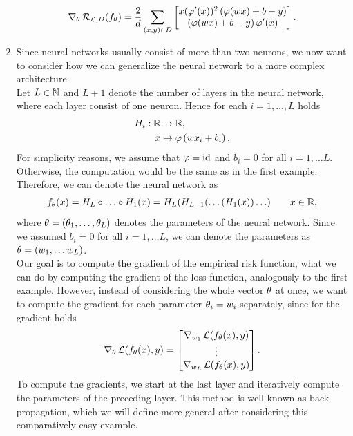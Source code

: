 \begin{example}
\begin{enumerate}
\begin{align*}
\nabla_{\theta} \operatorname{\mathcal{R}}_{\operatorname{\mathcal{L}}, D} (f_{\theta}) = \frac{2}{d} \sum_{(x,y)\in D} \left[ \begin{matrix}
x(\operatorname{\varphi}^{\prime}(x))^2\left(\operatorname{\varphi}(wx) + b - y \right)\\
\left(\operatorname{\varphi}(wx) + b - y \right) \operatorname{\varphi}^{\prime}(x)
\end{matrix}
\right].
\end{align*}
\item Since neural networks usually consist of more than two neurons, we now want to consider how we can generalize the neural network to a more complex architecture.\\
Let $L\in\operatorname{\mathbb{N}}$ and $L+1$ denote the number of layers in the neural network, where each layer consist of one neuron. Hence for each $i=1,\ldots, L$ holds
\begin{align*}
H_i: \operatorname{\mathbb{R}} &\to \operatorname{\mathbb{R}},\\
x &\mapsto \operatorname{\varphi}\left(wx_i + b_i\right).
\end{align*}
For simplicity reasons, we assume that $\operatorname{\varphi}=\mathrm{id}$ and $b_i=0$ for all $i=1,\ldots L$. Otherwise, the computation would be the same as in the first example. Therefore, we can denote the neural network as
\begin{align*}
f_\theta(x) = H_L \circ \ldots \circ H_1(x) = H_L(H_{L-1}(\ldots(H_1(x))\ldots) \qquad x\in\operatorname{\mathbb{R}},
\end{align*}
where $\theta=(\theta_1,\ldots,\theta_L)$ denotes the parameters of the neural network. Since we assumed $b_i=0$ for all $i=1,\ldots L$, we can denote the parameters as $\theta=(w_1,\ldots w_L)$.\\
Our goal is to compute the gradient of the empirical risk function, what we can do by computing the gradient of the loss function, analogously to the first example. However, instead of considering the whole vector $\theta$ at once, we want to compute the gradient for each parameter $\theta_i=w_i$ separately, since for the gradient holds
\begin{align*}
\nabla_\theta \operatorname{\mathcal{L}} (f_{\theta}(x), y) = \left[\begin{matrix}
\nabla_{w_1}\operatorname{\mathcal{L}} (f_{\theta}(x), y)\\
\vdots\\
\nabla_{w_L}\operatorname{\mathcal{L}} (f_{\theta}(x), y)
\end{matrix} \right].
\end{align*}
To compute the gradients, we start at the last layer and iteratively compute the parameters of the preceding layer. This method is well known as back-propagation, which we will define more general after considering this comparatively easy example.\\

\end{enumerate}
\end{example}
